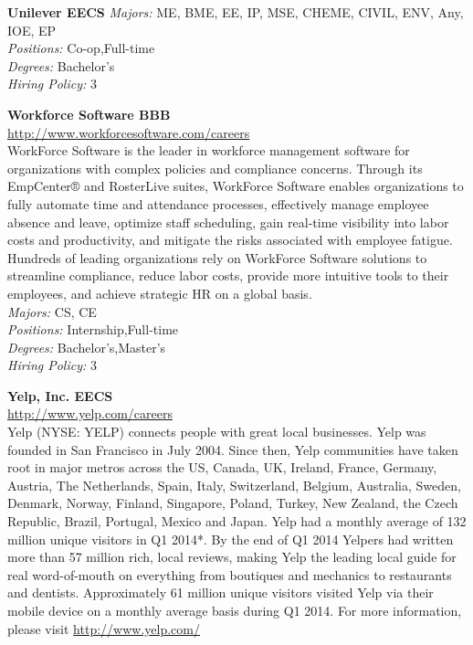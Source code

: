 \documentclass[twoside]{article}
\begin{document}
\begin{center}
\begin{multicols}{2}
\begin{minipage}{.95\columnwidth}{\Large\bf Unilever \hfill EECS}
    \emph{Majors:} ME, BME, EE, IP, MSE, CHEME, CIVIL, ENV, Any, IOE, EP\\
    \emph{Positions:} Co-op,Full-time\\
    \emph{Degrees:} Bachelor's\\
    \emph{Hiring Policy:} 3\\
\end{minipage}
 \begin{minipage}{.95\columnwidth}{\Large\bf Workforce Software \hfill BBB}\\
    \url{http://www.workforcesoftware.com/careers}\\
    WorkForce Software is the leader in workforce management software for organizations with complex policies and compliance concerns. Through its EmpCenter® and RosterLive suites, WorkForce Software enables organizations to fully automate time and attendance processes, effectively manage employee absence and leave, optimize staff scheduling, gain real-time visibility into labor costs and productivity, and mitigate the risks associated with employee fatigue. Hundreds of leading organizations rely on WorkForce Software solutions to streamline compliance, reduce labor costs, provide more intuitive tools to their employees, and achieve strategic HR on a global basis.\\
    \emph{Majors:} CS, CE\\
    \emph{Positions:} Internship,Full-time\\
    \emph{Degrees:} Bachelor's,Master's\\
    \emph{Hiring Policy:} 3\\
\end{minipage}
 \begin{minipage}{.95\columnwidth}{\Large\bf Yelp, Inc. \hfill EECS}\\
    \url{http://www.yelp.com/careers}\\
    Yelp (NYSE: YELP) connects people with great local businesses. Yelp was founded in San Francisco in July 2004. Since then, Yelp communities have taken root in major metros across the US, Canada, UK, Ireland, France, Germany, Austria, The Netherlands, Spain, Italy, Switzerland, Belgium, Australia, Sweden, Denmark, Norway, Finland, Singapore, Poland, Turkey, New Zealand, the Czech Republic, Brazil, Portugal, Mexico and Japan. Yelp had a monthly average of 132 million unique visitors in Q1 2014*. By the end of Q1 2014 Yelpers had written more than 57 million rich, local reviews, making Yelp the leading local guide for real word-of-mouth on everything from boutiques and mechanics to restaurants and dentists. Approximately 61 million unique visitors visited Yelp via their mobile device on a monthly average basis during Q1 2014. For more information, please visit \url{http://www.yelp.com/}\\

\end{minipage}
\end{multicols}
\end{center}
\end{document}
